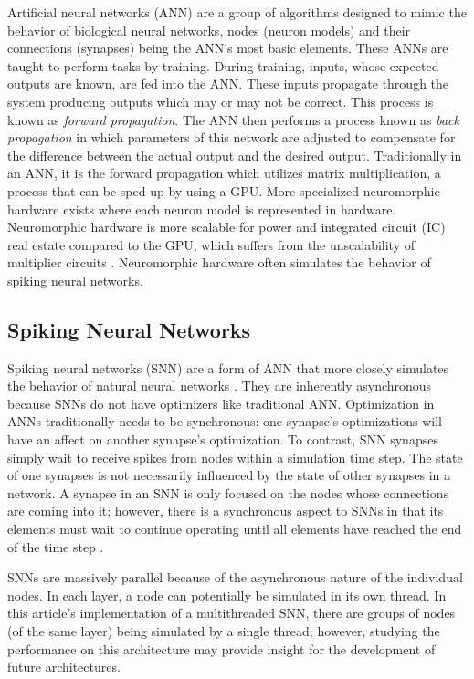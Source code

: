 \documentclass[journal]{IEEEtran}
\begin{document}
Artificial neural networks (ANN) are a group of algorithms designed to mimic the behavior of biological neural networks, nodes (neuron models) and their connections (synapses) being the ANN's most basic elements. These ANNs are taught to perform tasks by training. During training, inputs, whose expected outputs are known, are fed into the ANN. These inputs propagate through the system producing outputs which may or may not be correct. This process is known as \emph{forward propagation}. The ANN then performs a process known as \emph{back propagation} in which parameters of this network are adjusted to compensate for the difference between the actual output and the desired output. Traditionally in an ANN, it is the forward propagation which utilizes matrix multiplication, a process that can be sped up by using a GPU. More specialized neuromorphic hardware exists where each neuron model is represented in hardware. Neuromorphic hardware is more scalable for power and integrated circuit (IC) real estate compared to the GPU, which suffers from the unscalability of multiplier circuits \cite{Bouvier2019}\cite{li2020spiking}. Neuromorphic hardware often simulates the behavior of spiking neural networks.

\subsection{Spiking Neural Networks}

Spiking neural networks (SNN) are a form of ANN that more closely simulates the behavior of natural neural networks \cite{Maass1997}. They are inherently asynchronous because SNNs do not have optimizers like traditional ANN. Optimization in ANNs traditionally needs to be synchronous: one synapse's optimizations will have an affect on another synapse's optimization. To contrast, SNN synapses simply wait to receive spikes from nodes within a simulation time step. The state of one synapses is not necessarily influenced by the state of other synapses in a network. A synapse in an SNN is only focused on the nodes whose connections are coming into it; however, there is a synchronous aspect to SNNs in that its elements must wait to continue operating until all elements have reached the end of the time step \cite{Bouvier2019}.

SNNs are massively parallel because of the asynchronous nature of the individual nodes. In each layer, a node can potentially be simulated in its own thread. In this article's implementation of a multithreaded SNN, there are groups of nodes (of the same layer) being simulated by a single thread; however, studying the performance on this architecture may provide insight for the development of future architectures. 
\end{document}
